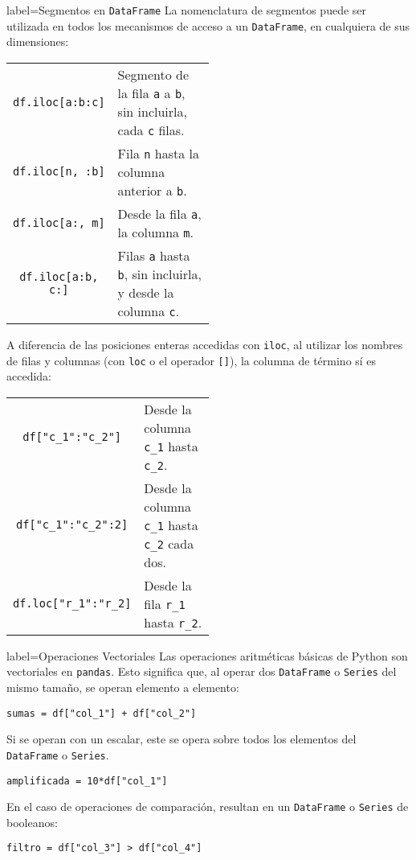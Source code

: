 \begin{contentbox}{label=Segmentos en \texttt{DataFrame}}
    La nomenclatura de segmentos puede ser utilizada en todos los mecanismos de acceso a un \texttt{DataFrame}, en cualquiera de sus dimensiones:
    
    \begin{tabular}{C|p{0.5\linewidth}}
        \lstinline!df.iloc[a:b:c]! &  Segmento de la fila \texttt{a} a \texttt{b}, sin incluirla, cada \texttt{c} filas. \\
        \lstinline!df.iloc[n, :b]! &  Fila \texttt{n} hasta la columna anterior a \texttt{b}. \\
        \lstinline!df.iloc[a:, m]! &  Desde la fila \texttt{a}, la columna \texttt{m}. \\
        \lstinline!df.iloc[a:b, c:]! &  Filas \texttt{a} hasta \texttt{b}, sin incluirla, y desde la columna \texttt{c}.
    \end{tabular}
    
    A diferencia de las posiciones enteras accedidas con \lstinline!iloc!, al utilizar los nombres de filas y columnas (con \lstinline!loc! o el operador \lstinline![]!), la columna de término sí es accedida:
    
    \begin{tabular}{C|p{0.5\linewidth}}
        \lstinline!df["c_1":"c_2"]! &  Desde la columna \lstinline!c_1! hasta \lstinline!c_2!. \\
        \lstinline!df["c_1":"c_2":2]! &  Desde la columna \lstinline!c_1! hasta \lstinline!c_2! cada dos. \\
        \lstinline!df.loc["r_1":"r_2]! &  Desde la fila \lstinline!r_1! hasta \lstinline!r_2!. \\
    \end{tabular}
\end{contentbox}

\begin{contentbox}{label=Operaciones Vectoriales}
    Las operaciones aritméticas básicas de Python son \alert{vectoriales} en \texttt{pandas}. Esto significa que, al operar dos \texttt{DataFrame} o \texttt{Series} del mismo tamaño, se operan elemento a elemento:
    \begin{lstlisting}
sumas = df["col_1"] + df["col_2"]
    \end{lstlisting}
    
    Si se operan con un escalar, este se opera sobre todos los elementos del \texttt{DataFrame} o \texttt{Series}.
    \begin{lstlisting}
amplificada = 10*df["col_1"]
    \end{lstlisting}
    
    En el caso de operaciones de comparación, resultan en un \texttt{DataFrame} o \texttt{Series} de \alert{booleanos}:
    \begin{lstlisting}
filtro = df["col_3"] > df["col_4"]
    \end{lstlisting}
    
\end{contentbox}

